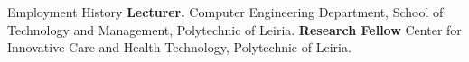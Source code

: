 \begin{rubric}{Employment History}
%
	\textbf{Lecturer.} Computer Engineering Department, School of Technology and Management, Polytechnic of Leiria.
%
%
\entry*[2021 -- 2023]%
	\textbf{Research Fellow} Center for Innovative Care and Health Technology, Polytechnic of Leiria.
%
\end{rubric}
